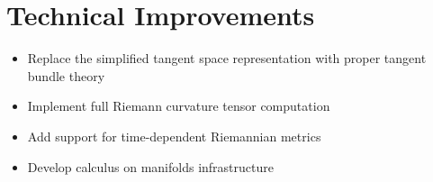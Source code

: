 \section{Technical Improvements}

\begin{itemize}
\item Replace the simplified tangent space representation with proper tangent bundle theory
\item Implement full Riemann curvature tensor computation
\item Add support for time-dependent Riemannian metrics
\item Develop calculus on manifolds infrastructure
\end{itemize}

